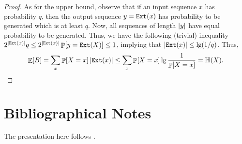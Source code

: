 \begin{proof}
    As for the upper bound, observe that if an input sequence $x$ has
    probability $q$, then the output sequence $y = \mathtt{E{x}t}(x)$ has
    probability to be generated which is at least $q$.  Now, all
    sequences of length $\left| {y} \right|$ have equal probability to be
    generated.  Thus, we have the following (trivial) inequality
    $2^{\cardin{\ExtractFunc(x)}} q \leq 2^{\cardin{\ExtractFunc(x)}}
    \Prob{y = \ExtractFunc(X)} \leq 1$, implying that
    $\left| {\mathtt{E{x}t}(x)} \right| \leq \lg(1/q)$. Thus,
    \begin{equation*}
        \Ex{B}%
        =%
        \sum_{x} \Prob{X = x} \cardin{\ExtractFunc(x)}%
        \leq%
        \sum_{x} \Prob{X = x} \lg \frac{1}{\Prob{X=x}}%
        =%
        \Entropy{X}.
    \end{equation*}
\end{proof}





\section{Bibliographical Notes}

The presentation here follows \cite[Sec. 9.1-Sec 9.3]{mu-pcrap-05}.


\ChapterEnd{}

%
